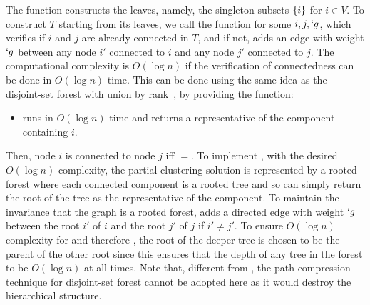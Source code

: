 The function \initialize constructs the leaves, namely, the singleton subsets $\{i\}$ for $i\in V$.
To construct $T$ starting from its leaves, we call the function  for some $i,j,`g$, which verifies if $i$ and $j$ are already connected in $T$, and
if not, adds an edge with weight $`g$ between any node $i'$ connected to $i$ and any node $j'$
connected to $j$. The computational complexity is $O(\log n)$ if the verification of connectedness can be
done in $O(\log n)$ time. This can be done using the same idea as the disjoint-set forest 
with union by rank~\cite{galler64,tarjan84}, by providing the function: 
\begin{itemize}
	\item {} runs in $O(\log n)$ time and returns a representative of the component containing $i$.
\end{itemize}
Then, node $i$ is connected to node $j$ iff $=$.
To implement \find, with the desired $O(\log n)$ complexity, the partial clustering solution is represented by a rooted
forest where each connected component is a rooted tree and so \find can simply return the root of
the tree as the representative of the component.
To maintain the invariance that the graph is a
rooted forest,  adds a directed edge with weight $`g$ between the root $i'$ of $i$
and the root $j'$ of $j$ if $i'\neq j'$. To ensure $O(\log n)$ complexity for \find and therefore
\merge, the root of the deeper tree is chosen to be the parent of the other root since this 
ensures that the depth of any tree in the forest to be $O(\log n)$ at all times. Note that, different from \cite{felzenszwalb2004efficient}, the path compression technique for disjoint-set forest cannot be adopted here as it would destroy the hierarchical structure. 

